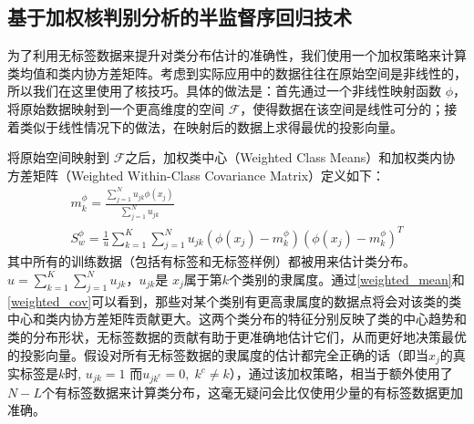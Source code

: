 \subsection{基于加权核判别分析的半监督序回归技术}
为了利用无标签数据来提升对类分布估计的准确性，我们使用一个加权策略来计算类均值和类内协方差矩阵。考虑到实际应用中的数据往往在原始空间是非线性的，所以我们在这里使用了核技巧。具体的做法是：首先通过一个非线性映射函数 \(\phi\)，将原始数据映射到一个更高维度的空间 \(\mathcal{F}\)，使得数据在该空间是线性可分的；接着类似于线性情况下的做法，在映射后的数据上求得最优的投影向量。

将原始空间映射到 \(\mathcal{F}\)之后，加权类中心（Weighted Class Means）和加权类内协方差矩阵（Weighted Within-Class Covariance Matrix）定义如下：
\begin{gather}
\label{weighted_mean}
m^{\phi}_{k}=\frac{\sum_{j=1}^{N} u_{jk}\phi(x_{j})}{\sum_{j=1}^{N} u_{jk}} \\
\label{weighted_cov}
S^{\phi}_{w}=\frac{1}{u} \sum_{k=1}^{K} \sum_{j=1}^{N} u_{jk}(\phi(x_{j})-m^{\phi}_{k})(\phi(x_{j})-m^{\phi}_{k})^{T}
\end{gather}
其中所有的训练数据（包括有标签和无标签样例）都被用来估计类分布。 \(u=\sum_{k=1}^{K} \sum_{j=1}^{N} u_{jk}\)，\(u_{jk}\)是 \(x_{j}\)属于第\(k\)个类别的隶属度。通过\autoref{weighted_mean}和\autoref{weighted_cov}可以看到，那些对某个类别有更高隶属度的数据点将会对该类的类中心和类内协方差矩阵贡献更大。这两个类分布的特征分别反映了类的中心趋势和类的分布形状，无标签数据的贡献有助于更准确地估计它们，从而更好地决策最优的投影向量。假设对所有无标签数据的隶属度的估计都完全正确的话（即当\(x_{j}\)的真实标签是\(k\)时, \(u_{jk}=1\) 而\(u_{jk^{c}}=0,\;k^{c}\neq k\)），通过该加权策略，相当于额外使用了\(N-L\)个有标签数据来计算类分布，这毫无疑问会比仅使用少量的有标签数据更加准确。


